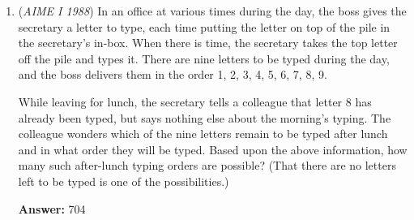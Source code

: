 \begin{enumerate}
 Let $\alpha = \arctan 2$. Note that the line of reflection, $y = 2x$, is the polar line $\theta = \alpha, \alpha+\pi$. Then $2\alpha = \arctan\left(-\frac{4}{3}\right)$, so $\cos(2\alpha) = -\frac{3}{5}$ and $\sin(2\alpha) = \frac{4}{5}$.

 Therefore, if $(x', y')$ is mapped to $(x, y)$ under the reflection, then $x = -\frac{3}{5}x'+\frac{4}{5}y'$ and $y = \frac{4}{5}x'+\frac{3}{5}y'$. Since the transformation matrix represents a reflection, it must be its own inverse; therefore, $x' = -\frac{3}{5}x+\frac{4}{5}y$ and $y' = \frac{4}{5}x+\frac{3}{5}y$.

 The original coordinates $(x', y')$ must satisfy $x'y' = 1$. Therefore,
 \[\left(-\frac{3}{5}x+\frac{4}{5}y\right)\left(\frac{4}{5}x+\frac{3}{5}y\right) = 1\]
 \[-\frac{12}{25}x^2 + \frac{7}{25}xy + \frac{12}{25}y^2 - 1 = 0\]
 \[12x^2 - 7xy - 12y^2 + 25 = 0\]Thus, $b = -7$ and $c = -12$, so $bc = 84$. The answer is $\boxed{084}$.

 



\textbf{Solution 4}

Find some simple points on the graph of C, reflect them and note down the new coordinates, and plug 'em into the given equation. After some plugging and chugging and solving the system of equations that follow, we get that  $b = -7$ and $c = -12$, so $bc = 84$. The answer is $\boxed{084}$.

 pi\_is\_3.141

 


	\item (\textit{AIME I 1988}) In an office at various times during the day, the boss gives the secretary a letter to type, each time putting the letter on top of the pile in the secretary's in-box. When there is time, the secretary takes the top letter off the pile and types it. There are nine letters to be typed during the day, and the boss delivers them in the order 1, 2, 3, 4, 5, 6, 7, 8, 9.


 While leaving for lunch, the secretary tells a colleague that letter 8 has already been typed, but says nothing else about the morning's typing. The colleague wonders which of the nine letters remain to be typed after lunch and in what order they will be typed. Based upon the above information, how many such after-lunch typing orders are possible? (That there are no letters left to be typed is one of the possibilities.)


 
 \textbf{Answer: }704




\end{enumerate}
